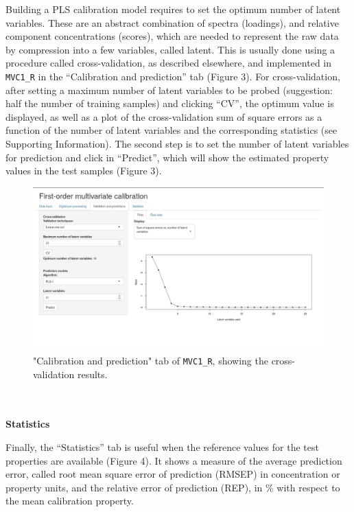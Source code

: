 \documentclass[10pt,twocolumn]{article}
\begin{document}
Building a PLS calibration model requires to set the optimum number of latent
variables. \cite{olivieri18} These are an abstract combination of spectra
(loadings), and relative component concentrations (scores), which are needed to
represent the raw data by compression into a few variables, called
latent.\cite{olivieri18} This is usually done using a procedure called
cross-validation, as described elsewhere, \cite{olivieri18} and implemented in
\texttt{MVC1\_R} in the “Calibration and prediction” tab (Figure 3). For
cross-validation, after setting a maximum number of latent variables to be
probed (suggestion: half the number of training samples) and clicking “CV”, the
optimum value is displayed, as well as a plot of the cross-validation sum of
square errors as a function of the number of latent variables and the
corresponding statistics (see Supporting Information). The second step is to
set the number of latent variables for prediction and click in “Predict”, which
will show the estimated property values in the test samples (Figure 3).
\begin{figure}
	\includegraphics[width=\linewidth]{figure3.jpg}
	\caption{"Calibration and prediction" tab of \texttt{MVC1\_R}, showing the
	cross-validation results.}
	\label{fig:3}
\end{figure}
\\ \\
\textbf{Statistics}

Finally, the “Statistics” tab is useful when the reference values for the test
properties are available (Figure 4). It shows a measure of the average
prediction error, called root mean square error of prediction (RMSEP) in
concentration or property units, and the relative error of prediction (REP), in
\% with respect to the mean calibration property. \\
\end{document}
